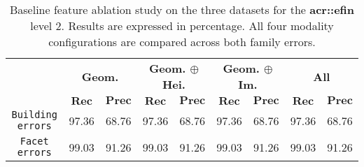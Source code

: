 \begin{table}[htbp]
\begin{tabular}{|c | c c | c c | c c | c c |}
                \hline
                & \multicolumn{2}{c|}{\textbf{Geom.}} & \multicolumn{2}{c|}{\textbf{Geom. \(\oplus\) Hei.}} & \multicolumn{2}{c|}{\textbf{Geom. \(\oplus\) Im.}} & \multicolumn{2}{x{1.8cm}|}{\textbf{All}}\\
                \cline{2-9}
                & \(\bm{Rec}\) & \(\bm{Prec}\) &  \(\bm{Rec}\) & \(\bm{Prec}\) &  \(\bm{Rec}\) & \(\bm{Prec}\) &  \(\bm{Rec}\) & \(\bm{Prec}\) \\
                \hline
                \texttt{Building errors} & 97.36 & 68.76 & 97.36 & 68.76 & 97.36 & 68.76 & 97.36 & 68.76 \\
                \hline
                \texttt{Facet errors} & 99.03 & 91.26 & 99.03 & 91.26 & 99.03 & 91.26 & 99.03 & 91.26 \\
                \hline
            \end{tabular}
            \caption[
                Baseline feature ablation study on the three datasets for the \textbf{\gls{acr::efin}} level 2.
            ]{
                \label{tab::ablation_f2}
                Baseline feature ablation study on the three datasets for the \textbf{\gls{acr::efin}} level 2.
                Results are expressed in percentage.
                All four modality configurations are compared across both family errors.
            }
        \end{table}
    
